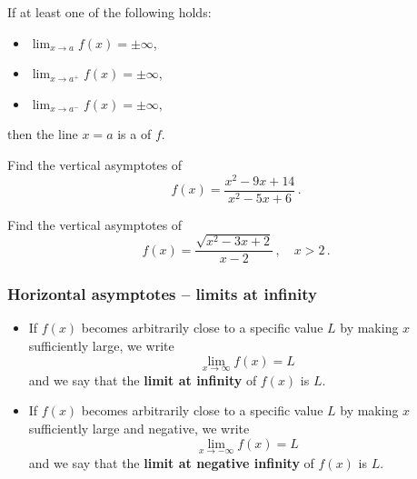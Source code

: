 \documentclass[10pt,t,presentation,ignorenonframetext,aspectratio=169]{beamer}
\begin{document}
\begin{frame}
  \vs
  \begin{defn}
    If at least one of the following holds:
    \begin{itemize}
    \item $\lim_{x\to a} f(x) = \pm\infty$,
    \item $\lim_{x\to a^+} f(x) = \pm\infty$,
    \item $\lim_{x\to a^-} f(x) = \pm\infty$,
    \end{itemize}
    then the line $x=a$ is a  of $f$.
  \end{defn}
\end{frame}

\begin{frame}
  \vs
  \begin{question}
    Find the vertical asymptotes of
    \[
      f(x) = \frac{ x^2-9x+14 }{ x^2-5x+6 } \,.
    \]
  \end{question}
\end{frame}

\begin{frame}
  \vs
  \begin{question}
    Find the vertical asymptotes of
    \[
      f(x) = \frac{ \sqrt{x^2-3x+2} }{ x-2 }
      \,, \quad x > 2 \,.
    \]
  \end{question}
\end{frame}

\begin{frame}
  \frametitle{Horizontal asymptotes -- limits at infinity}


  \begin{defn}
    \begin{itemize}
    \item If $f(x)$ becomes arbitrarily close to a specific value $L$
      by making $x$ sufficiently large, we write
      \[
        \lim_{x \to \infty} f(x) = L
      \]
      and we say that the \textbf{limit at infinity} of $f(x)$ is $L$.
    \item If $f(x)$ becomes arbitrarily close to a specific value $L$
      by making $x$ sufficiently large and negative, we write
      \[
        \lim_{x \to -\infty} f(x) = L
      \]
      and we say that the \textbf{limit at negative infinity} of $f(x)$ is $L$.
    \end{itemize}
  \end{defn}
\end{frame}
\end{document}
